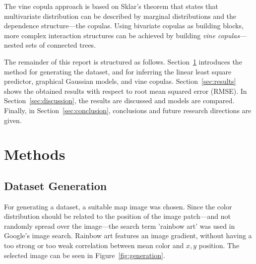 \documentclass{article}
\begin{document}
The vine copula approach is based on Sklar's theorem that states that
multivariate distribution can be described by marginal distributions
and the dependence structure---the copulas. Using bivariate copulas as
building blocks, more complex interaction structures can be achieved
by building \emph{vine copulas}---nested sets of connected trees.


The remainder of this report is structured as
follows. Section~\ref{sec:methods} introduces the method for
generating the dataset, and for inferring the linear least square
predictor, graphical Gaussian models, and vine
copulas. Section~\ref{sec:results} shows the obtained results with
respect to root mean squared error (RMSE). In
Section~\ref{sec:discussion}, the results are discussed and models are
compared. Finally, in Section~\ref{sec:conclusion}, conclusions and
future research directions are given.

\section{Methods}
\label{sec:methods}

\subsection{Dataset Generation}

For generating a dataset, a suitable map image was chosen. Since the
color distribution should be related to the position of the image
patch---and not randomly spread over the image---the search term
'rainbow art' was used in Google's image search. Rainbow art features
an image gradient, without having a too strong or too weak correlation
between mean color and $x, y$ position. The selected image can be seen
in Figure~\ref{fig:generation}.
\end{document}
